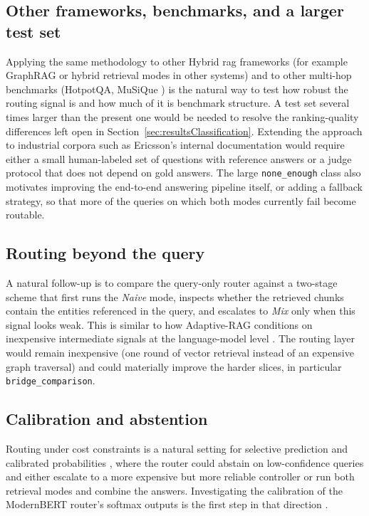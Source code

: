 \documentclass[english, bibtex]{kththesis}               %
\numberwithin{listing}{chapter}
\providecommand{\DIFaddtex}[1]{{\protect\color{blue} \sf #1}} %
\providecommand{\DIFaddbegin}{} %
\providecommand{\DIFadd}[1]{\texorpdfstring{\DIFaddtex{#1}}{#1}} %
\begin{document}
\subsection{Other frameworks, benchmarks, and a larger test set} Applying the same methodology to other Hybrid \gls{rag} frameworks (for example GraphRAG \cite{edge2024graphrag} or hybrid retrieval modes in other systems) and to other multi-hop benchmarks (HotpotQA, MuSiQue \cite{yang2018hotpotqa,trivedi2022musique}) is the natural way to test how robust the routing signal is and how much of it is benchmark structure. A test set several times larger than the present one would be needed to resolve the ranking-quality differences left open in Section~\ref{sec:resultsClassification}. Extending the approach to industrial corpora such as Ericsson's internal documentation would require either a small human-labeled set of questions with reference answers or a judge protocol that does not depend on gold answers. The large \texttt{none\_enough} class also motivates improving the end-to-end answering pipeline itself, or adding a fallback strategy, so that more of the queries on which both modes currently fail become routable.

\subsection{Routing beyond the query} A natural follow-up is to compare the query-only router against a two-stage scheme that first runs the \emph{Naive} mode, inspects whether the retrieved chunks contain the entities referenced in the query, and escalates to \emph{Mix} only when this signal looks weak. This is similar to how Adaptive-RAG conditions on inexpensive intermediate signals at the language-model level \cite{jeong2024adaptiverag}. The routing layer would remain inexpensive (one round of vector retrieval instead of an expensive graph traversal) and could materially improve the harder slices, in particular \texttt{bridge\_comparison}.

\subsection{Calibration and abstention} Routing under cost constraints is a natural setting for selective prediction \cite{geifman2017selective} and calibrated probabilities \cite{guo2017calibration}, where the router could abstain on low-confidence queries and either escalate to a more expensive but more reliable controller or run both retrieval modes and combine the answers. Investigating the calibration of the ModernBERT router's softmax outputs is the first step in that direction\DIFaddbegin \DIFadd{.
}
\end{document}
